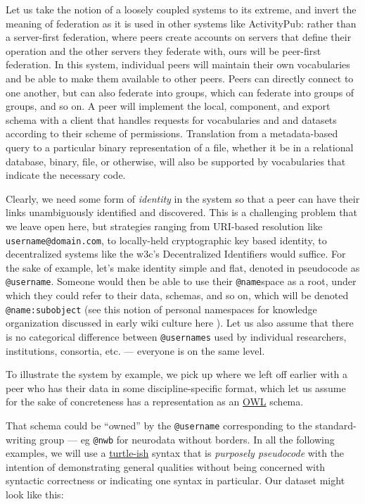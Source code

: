 Let us take the notion of a loosely coupled systems to its extreme, and
invert the meaning of federation as it is used in other systems like
ActivityPub: rather than a server-first federation, where peers create
accounts on servers that define their operation and the other servers
they federate with, ours will be peer-first federation. In this system,
individual peers will maintain their own vocabularies and be able to
make them available to other peers. Peers can directly connect to one
another, but can also federate into groups, which can federate into
groups of groups, and so on. A peer will implement the local, component,
and export schema with a client that handles requests for vocabularies
and and datasets according to their scheme of permissions. Translation
from a metadata-based query to a particular binary representation of a
file, whether it be in a relational database, binary, file, or
otherwise, will also be supported by vocabularies that indicate the
necessary code.

Clearly, we need some form of \emph{identity} in the system so that a
peer can have their links unambiguously identified and discovered. This
is a challenging problem that we leave open here, but strategies ranging
from URI-based resolution like \texttt{username@domain.com}, to
locally-held cryptographic key based identity, to decentralized systems
like the w3c's Decentralized Identifiers \citep{spornyDecentralizedIdentifiersDIDs2021}  would suffice. For the sake
of example, let's make identity simple and flat, denoted in pseudocode
as \texttt{@username}. Someone would then be able to use their
\texttt{@name}space as a root, under which they could refer to their
data, schemas, and so on, which will be denoted \texttt{@name:subobject}
(see this notion of personal namespaces for knowledge organization
discussed in early wiki culture here \citep{MeatballWikiPersonalCategories} ). Let us also assume that there is
no categorical difference between \texttt{@usernames} used by individual
researchers, institutions, consortia, etc. --- everyone is on the same
level.

To illustrate the system by example, we pick up where we left off
earlier with a peer who has their data in some discipline-specific
format, which let us assume for the sake of concreteness has a
representation as an \href{https://www.w3.org/OWL/}{OWL} schema.

That schema could be ``owned'' by the \texttt{@username} corresponding
to the standard-writing group --- eg \texttt{@nwb} for neurodata without
borders. In all the following examples, we will use a
\href{https://www.w3.org/TR/turtle/}{turtle-ish} syntax that is
\emph{purposely pseudocode} with the intention of demonstrating general
qualities without being concerned with syntactic correctness or
indicating one syntax in particular. Our dataset might look like this:

